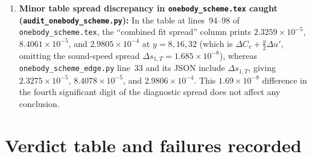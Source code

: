 \documentclass[11pt,a4paper]{article}
\newcommand{\dd}{\mathrm d}
\newcommand{\scr}{\texttt{audit\_\allowbreak onebody\_\allowbreak scheme.py}}
\begin{document}
\begin{enumerate}
   because $\frac{3}{4}y^{-3/2}\int y^{3/2}(-2e_0 y^{-3})\,\dd y = +\frac{3e_0}{y^2}$;
  (iv) lines~197--199 misstate the bad stable-band resonance at $q_* = -\sqrt{3}/2$
  (for $v=+1$) as $\omega_b(q_*) = -vq_*$ with $\omega_b'(q_*) = -1/2$, whereas in fact
  $\omega_b(q_*) = \frac{\sqrt{3}}{4} \neq \pm q_*$ and
  $\omega_b'(q_*) = \operatorname{sgn}(q_*)\frac{1-2q_*^2}{\sqrt{1-q_*^2}} = +1 = v$
  (a stationary co-moving phase resonance $\omega_b'(q_*) = v$).
  \item \textbf{Minor table spread discrepancy in \texttt{onebody\_\allowbreak scheme.tex} caught (\scr):}
  In the table at lines~94--98 of \texttt{onebody\_\allowbreak scheme.tex}, the ``combined fit spread''
  column prints $2.3259\times 10^{-5}$, $8.4061\times 10^{-5}$, and $2.9805\times 10^{-4}$
  at $y=8,16,32$ (which is $\Delta C_v + \frac{y}{2}\Delta u'$, omitting the sound-speed
  spread $\Delta s_{1,T} = 1.685\times 10^{-8}$), whereas \texttt{onebody\_\allowbreak scheme\_\allowbreak edge.py}
  line~33 and its JSON include $\Delta s_{1,T}$, giving $2.3275\times 10^{-5}$,
  $8.4078\times 10^{-5}$, and $2.9806\times 10^{-4}$. This $1.69\times 10^{-8}$
  difference in the fourth significant digit of the diagnostic spread does not affect
  any conclusion.
\end{enumerate}

\section{Verdict table and failures recorded}
\end{document}
